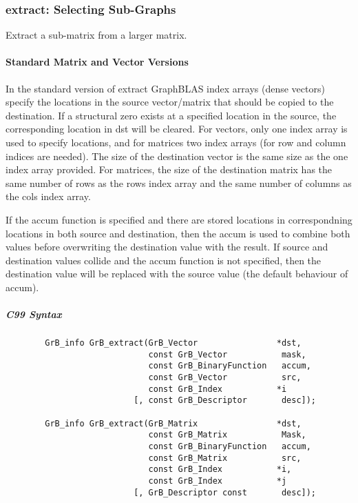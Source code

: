 \subsubsection{{\sf extract}: Selecting Sub-Graphs}

Extract a sub-matrix from a larger matrix. 

\paragraph{Standard Matrix and Vector Versions}

In the standard version of {\sf extract} GraphBLAS index arrays (dense vectors)
specify the locations in the source vector/matrix that should be copied to the
destination.  If a structural zero exists at a specified location in the source,
the corresponding location in dst will be cleared.  For vectors, only one index array is used to specify
locations, and for matrices two index arrays (for row and column indices are needed).
The size of the destination vector is the same size as the one index array provided.
For matrices, the size of the destination matrix has the same number of rows as the
{\sf rows} index array and the same number of columns as the {\sf cols} index array.

If the {\sf accum} function is specified and there are stored locations in correspondning
locations in both source and destination, then the
{\sf accum} is used to combine both values before overwriting the destination value
with the result.  If source and destination values collide and the {\sf accum} function is
not specified, then the destination value will be replaced with the source value (the
default behaviour of {\sf accum}).

\subparagraph{C99 Syntax}

\begin{verbatim}
        GrB_info GrB_extract(GrB_Vector                *dst,
                             const GrB_Vector           mask,
                             const GrB_BinaryFunction   accum,
                             const GrB_Vector           src,
                             const GrB_Index           *i
                          [, const GrB_Descriptor       desc]);
                  
        GrB_info GrB_extract(GrB_Matrix                *dst,
                             const GrB_Matrix           Mask,
                             const GrB_BinaryFunction   accum,
                             const GrB_Matrix           src,
                             const GrB_Index           *i,
                             const GrB_Index           *j
                          [, GrB_Descriptor const       desc]);
\end{verbatim}

